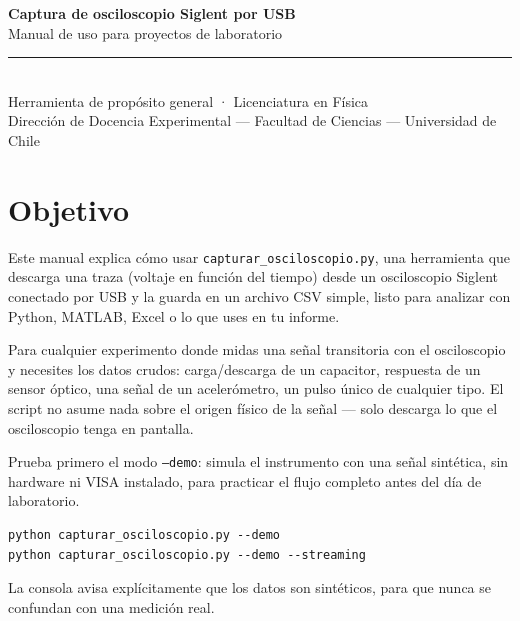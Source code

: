 \documentclass[11pt,a4paper]{article}
\begin{document}
\begin{center}
  {\Large\bfseries Captura de osciloscopio Siglent por USB}\\[2pt]
  {\large Manual de uso para proyectos de laboratorio}\\[10pt]
  {\color{gmedio}\rule{0.45\textwidth}{0.4pt}}\\[8pt]
  {\small\color{gmedio}Herramienta de propósito general · Licenciatura en Física}\\[2pt]
  {\footnotesize\color{gmedio}Dirección de Docencia Experimental — Facultad de Ciencias — Universidad de Chile}
\end{center}
\vspace{0.6em}

\section{Objetivo}
Este manual explica cómo usar \texttt{capturar\_osciloscopio.py}, una
herramienta que descarga una traza (voltaje en función del tiempo) desde un
osciloscopio Siglent conectado por USB y la guarda en un archivo CSV simple,
listo para analizar con Python, MATLAB, Excel o lo que uses en tu informe.

\begin{nota}[title=¿Para qué proyectos sirve?]
Para cualquier experimento donde midas una señal transitoria con el
osciloscopio y necesites los datos crudos: carga/descarga de un capacitor,
respuesta de un sensor óptico, una señal de un acelerómetro, un pulso único
de cualquier tipo. El script no asume nada sobre el origen físico de la
señal --- solo descarga lo que el osciloscopio tenga en pantalla.
\end{nota}

\begin{nota}[title=¿Todavía no tienes el osciloscopio a mano?]
Prueba primero el modo \texttt{--demo}: simula el instrumento con una señal
sintética, sin hardware ni VISA instalado, para practicar el flujo completo
antes del día de laboratorio.
\begin{lstlisting}
python capturar_osciloscopio.py --demo
python capturar_osciloscopio.py --demo --streaming
\end{lstlisting}
La consola avisa explícitamente que los datos son sintéticos, para que
nunca se confundan con una medición real.
\end{nota}
\end{document}
